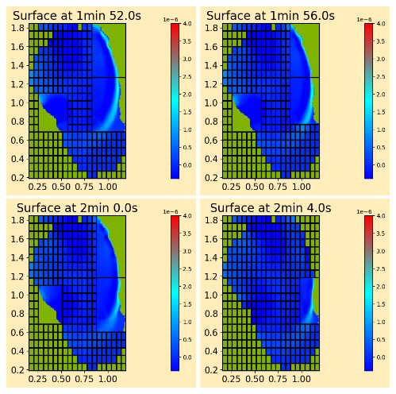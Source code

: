 \documentclass[11pt]{article}
\begin{document}
\vskip 10pt 
\includegraphics[width=0.475\textwidth]{frame0028fig0.png}
\vskip 10pt 
\includegraphics[width=0.475\textwidth]{frame0029fig0.png}
\vskip 10pt 
\includegraphics[width=0.475\textwidth]{frame0030fig0.png}
\vskip 10pt 
\includegraphics[width=0.475\textwidth]{frame0031fig0.png}
\end{document}
